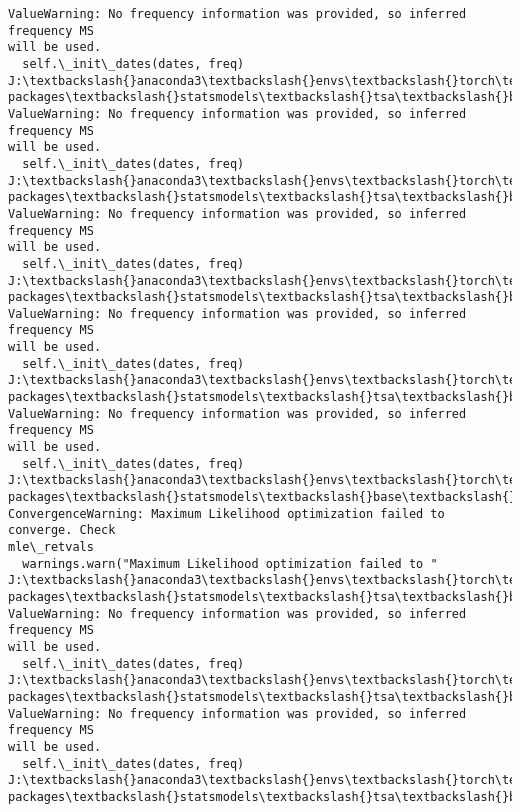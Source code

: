 \documentclass[11pt]{article}
\begin{document}
\begin{Verbatim}[commandchars=\\\{\}]
ValueWarning: No frequency information was provided, so inferred frequency MS
will be used.
  self.\_init\_dates(dates, freq)
J:\textbackslash{}anaconda3\textbackslash{}envs\textbackslash{}torch\textbackslash{}Lib\textbackslash{}site-packages\textbackslash{}statsmodels\textbackslash{}tsa\textbackslash{}base\textbackslash{}tsa\_model.py:473:
ValueWarning: No frequency information was provided, so inferred frequency MS
will be used.
  self.\_init\_dates(dates, freq)
J:\textbackslash{}anaconda3\textbackslash{}envs\textbackslash{}torch\textbackslash{}Lib\textbackslash{}site-packages\textbackslash{}statsmodels\textbackslash{}tsa\textbackslash{}base\textbackslash{}tsa\_model.py:473:
ValueWarning: No frequency information was provided, so inferred frequency MS
will be used.
  self.\_init\_dates(dates, freq)
J:\textbackslash{}anaconda3\textbackslash{}envs\textbackslash{}torch\textbackslash{}Lib\textbackslash{}site-packages\textbackslash{}statsmodels\textbackslash{}tsa\textbackslash{}base\textbackslash{}tsa\_model.py:473:
ValueWarning: No frequency information was provided, so inferred frequency MS
will be used.
  self.\_init\_dates(dates, freq)
J:\textbackslash{}anaconda3\textbackslash{}envs\textbackslash{}torch\textbackslash{}Lib\textbackslash{}site-packages\textbackslash{}statsmodels\textbackslash{}tsa\textbackslash{}base\textbackslash{}tsa\_model.py:473:
ValueWarning: No frequency information was provided, so inferred frequency MS
will be used.
  self.\_init\_dates(dates, freq)
J:\textbackslash{}anaconda3\textbackslash{}envs\textbackslash{}torch\textbackslash{}Lib\textbackslash{}site-packages\textbackslash{}statsmodels\textbackslash{}base\textbackslash{}model.py:607:
ConvergenceWarning: Maximum Likelihood optimization failed to converge. Check
mle\_retvals
  warnings.warn("Maximum Likelihood optimization failed to "
J:\textbackslash{}anaconda3\textbackslash{}envs\textbackslash{}torch\textbackslash{}Lib\textbackslash{}site-packages\textbackslash{}statsmodels\textbackslash{}tsa\textbackslash{}base\textbackslash{}tsa\_model.py:473:
ValueWarning: No frequency information was provided, so inferred frequency MS
will be used.
  self.\_init\_dates(dates, freq)
J:\textbackslash{}anaconda3\textbackslash{}envs\textbackslash{}torch\textbackslash{}Lib\textbackslash{}site-packages\textbackslash{}statsmodels\textbackslash{}tsa\textbackslash{}base\textbackslash{}tsa\_model.py:473:
ValueWarning: No frequency information was provided, so inferred frequency MS
will be used.
  self.\_init\_dates(dates, freq)
J:\textbackslash{}anaconda3\textbackslash{}envs\textbackslash{}torch\textbackslash{}Lib\textbackslash{}site-packages\textbackslash{}statsmodels\textbackslash{}tsa\textbackslash{}base\textbackslash{}tsa\_model.py:473:

\end{Verbatim}
\end{document}
